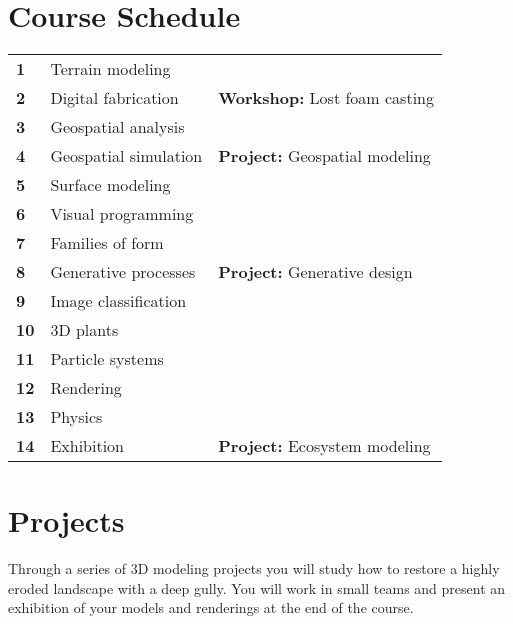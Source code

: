 \documentclass[11pt,article,oneside]{memoir}
\begin{document}


\section{Course Schedule}

\begin{table}[H]
\small
\begin{tabular}{l l @{\hskip 1cm}l}
%
\textbf{1} & Terrain modeling\\
\textbf{2} & Digital fabrication & \textbf{Workshop:} Lost foam casting\\
\textbf{3} & Geospatial analysis\\
\textbf{4} & Geospatial simulation & \textbf{Project:} Geospatial modeling\\
%
\textbf{5} & Surface modeling\\
\textbf{6} & Visual programming\\
\textbf{7} & Families of form\\
\textbf{8} & Generative processes & \textbf{Project:} Generative design\\
%
\textbf{9} & Image classification\\
\textbf{10} & 3D plants\\
\textbf{11} & Particle systems\\
\textbf{12} & Rendering\\
\textbf{13} & Physics\\
\textbf{14} & Exhibition & \textbf{Project:} Ecosystem modeling\\
%
\end{tabular}
\end{table}


\section{Projects}
Through a series of 3D modeling projects you will 
study how to restore a highly eroded landscape with a deep gully.
You will work in small teams and present an exhibition of your
models and renderings at the end of the course.\\
\end{document}
